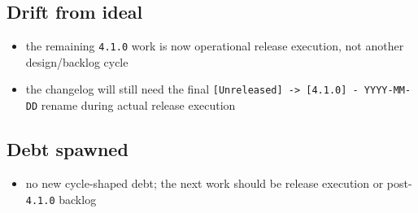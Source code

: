 \subsection{Drift from ideal}\label{record-204-drift-from-ideal}

\begin{itemize}
\tightlist
\item
  the remaining \texttt{4\allowbreak{}.\allowbreak{}1\allowbreak{}.\allowbreak{}0} work is now operational release execution, not another design/backlog cycle
\item
  the changelog will still need the final \texttt{[\allowbreak{}U\allowbreak{}n\allowbreak{}r\allowbreak{}e\allowbreak{}l\allowbreak{}e\allowbreak{}a\allowbreak{}s\allowbreak{}e\allowbreak{}d\allowbreak{}]\allowbreak{} \allowbreak{}-\allowbreak{}>\allowbreak{} \allowbreak{}[\allowbreak{}4\allowbreak{}.\allowbreak{}1\allowbreak{}.\allowbreak{}0\allowbreak{}]\allowbreak{} \allowbreak{}-\allowbreak{} \allowbreak{}Y\allowbreak{}Y\allowbreak{}Y\allowbreak{}Y\allowbreak{}-\allowbreak{}M\allowbreak{}M\allowbreak{}-\allowbreak{}D\allowbreak{}D} rename during actual release execution
\end{itemize}

\subsection{Debt spawned}\label{record-204-debt-spawned}

\begin{itemize}
\tightlist
\item
  no new cycle-shaped debt; the next work should be release execution or post-\texttt{4\allowbreak{}.\allowbreak{}1\allowbreak{}.\allowbreak{}0} backlog
\end{itemize}

